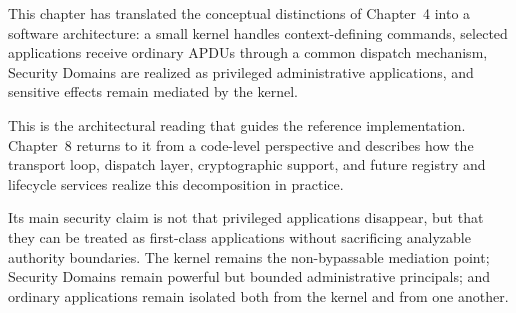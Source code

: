 This chapter has translated the conceptual distinctions of Chapter~4 into
a software architecture: a small kernel handles context-defining
commands, selected applications receive ordinary APDUs through a common
dispatch mechanism, Security Domains are realized as privileged
administrative applications, and sensitive effects remain mediated by the
kernel.

This is the architectural reading that guides the reference
implementation. Chapter~8 returns to it from a code-level perspective and
describes how the transport loop, dispatch layer, cryptographic support,
and future registry and lifecycle services realize this decomposition in
practice.

Its main security claim is not that privileged applications disappear,
but that they can be treated as first-class applications without
sacrificing analyzable authority boundaries. The kernel remains the
non-bypassable mediation point; Security Domains remain powerful but
bounded administrative principals; and ordinary applications remain
isolated both from the kernel and from one another.

